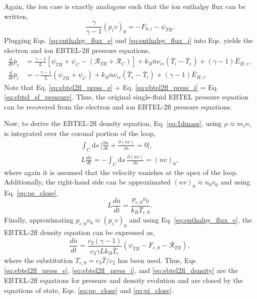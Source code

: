 Again, the ion case is exactly analogous such that the ion enthalpy flux can be written,
\begin{equation}
	\label{eq:enthalpy_flux_i}
	\frac{\gamma}{\gamma - 1}(p_iv)_0 =  - F_{0,i} - \psi_{TR}.
\end{equation}
Plugging Eqs. \ref{eq:enthalpy_flux_e} and \ref{eq:enthalpy_flux_i} into Eqs. yields the electron and ion EBTEL-2fl pressure equations,
\begin{align}
	\frac{d}{dt}\bar{p}_e &= \frac{\gamma - 1}{L}[\psi_{TR} + \psi_C -(\mathcal{R}_{TR} + \mathcal{R}_C)] + k_B\bar{n}\nu_{ei}(\bar{T}_i-\bar{T}_e) + (\gamma-1)\bar{E}_{H,e},\label{eq:ebtel2fl_press_e} \\[0.5em]
	\frac{d}{dt}\bar{p}_i &= -\frac{\gamma - 1}{L}(\psi_{TR} + \psi_C) + k_B\bar{n}\nu_{ei}(\bar{T}_e-\bar{T}_i) + (\gamma-1)\bar{E}_{H,i}.\label{eq:ebtel2fl_press_i}
\end{align}
Note that Eq. \ref{eq:ebtel2fl_press_e} + Eq. \ref{eq:ebtel2fl_press_i} = Eq. \ref{eq:ebtel_sf_pressure}. Thus, the original single-fluid EBTEL pressure equation can be recovered from the electron and ion EBTEL-2fl pressure equations.
%
\par Now, to derive the EBTEL-2fl density equation, Eq. \ref{eq:1dmass}, using $\rho\approx m_in,$ is integrated over the coronal portion of the loop,
\begin{align}
	\int_{C}\mathrm{d}s~\Big[\frac{\partial n}{\partial t} + \frac{\partial (nv)}{\partial s} = 0\Big], \\[0.5em]
	L\frac{d\bar{n}}{dt} = -\int_C\mathrm{d}s~\frac{\partial (nv)}{\partial s} = (nv)_0,
\end{align}
where again it is assumed that the velocity vanishes at the apex of the loop. Additionally, the right-hand side can be approximated $(nv)_0\approx n_0v_0$ and using Eq. \ref{eq:pe_close}, 
\begin{equation}
	L\frac{d\bar{n}}{dt} = \frac{p_{e,0}v_0}{k_BT_{e,0}}.
\end{equation}
Finally, approximating $p_{e,0}v_0\approx(p_ev)_0$ and using Eq. \ref{eq:enthalpy_flux_e}, the EBTEL-2fl density equation can be expressed as,
\begin{equation}
	\label{eq:ebtel2fl_density}
	\frac{d \bar{n}}{dt} = \frac{c_2(\gamma-1)}{c_3\gamma Lk_B\bar{T}_e}(\psi_{TR} - F_{e,0}-\mathcal{R}_{TR}),
\end{equation}
where the substitution $T_{e,0}=c_3\bar{T}/c_2$ has been used. Thus, Eqs. \ref{eq:ebtel2fl_press_e}, \ref{eq:ebtel2fl_press_i}, and \ref{eq:ebtel2fl_density} are the EBTEL-2fl equations for pressure and density evolution and are closed by the equations of state, Eqs. \ref{eq:pe_close} and \ref{eq:pi_close}.
